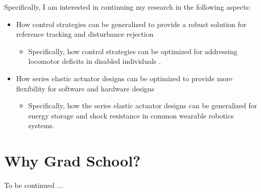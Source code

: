 \documentclass[8pt]{article}
\begin{document}
Specifically, I am interested in continuing my research in the following aspects:

\begin{itemize}

    \item {How control strategies can be generalized to provide a robust solution for reference tracking and disturbance rejection}
    \begin{itemize}
        \item {Specifically, how control strategies can be optimized for addressing locomotor deficits in disabled individuals \cite{OSL2020}. }
    \end{itemize}
    \item {How series elastic actuator designs can be optimized to provide more flexibility for software and hardware designs}
    \begin{itemize}
        \item {Specifically, how the series elastic actuator designs can be generalized for energy storage and shock resistance in common wearable robotics systems.}
    \end{itemize}

\end{itemize}



\section{Why Grad School?} \label{sec:GradSchool}
To be continued ... 



\end{document}
